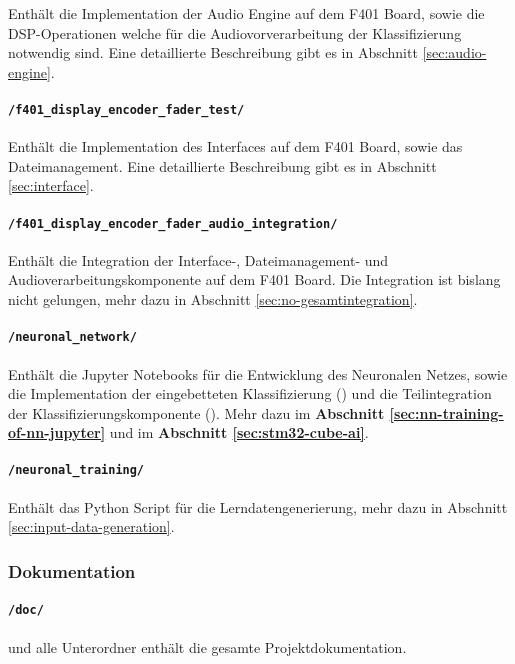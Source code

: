 Enthält die Implementation der Audio Engine auf dem F401 Board, sowie die DSP-Operationen welche für die Audiovorverarbeitung der Klassifizierung notwendig sind. Eine detaillierte Beschreibung gibt es in Abschnitt \ref{sec:audio-engine}.

\paragraph{\texttt{/f401\_display\_encoder\_fader\_test/}}

Enthält die Implementation des Interfaces auf dem F401 Board, sowie das Dateimanagement. Eine detaillierte Beschreibung gibt es in Abschnitt \ref{sec:interface}.

\paragraph{\texttt{/f401\_display\_encoder\_fader\_audio\_integration/}}

Enthält die Integration der Interface-, Dateimanagement- und Audioverarbeitungskomponente auf dem F401 Board. Die Integration ist bislang nicht gelungen, mehr dazu in Abschnitt \ref{sec:no-gesamtintegration}.

\paragraph{\texttt{/neuronal\_network/}}

Enthält die Jupyter Notebooks für die Entwicklung des Neuronalen Netzes, sowie die Implementation der eingebetteten Klassifizierung () und die Teilintegration der Klassifizierungskomponente (). Mehr dazu im \textbf{Abschnitt \ref{sec:nn-training-of-nn-jupyter}} und im \textbf{Abschnitt \ref{sec:stm32-cube-ai}}.

\paragraph{\texttt{/neuronal\_training/}}

Enthält das Python Script für die Lerndatengenerierung, mehr dazu in Abschnitt \ref{sec:input-data-generation}.

\subsubsection{Dokumentation}

\paragraph{\texttt{/doc/}} und alle Unterordner enthält die gesamte Projektdokumentation.

